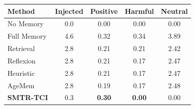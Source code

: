 \begin{tabular}{lcccc}
\toprule
Method & Injected & Positive & Harmful & Neutral \\
\midrule
No Memory & 0.0 & 0.00 & 0.00 & 0.00 \\
Full Memory & 4.6 & 0.32 & 0.34 & 3.89 \\
Retrieval & 2.8 & 0.21 & 0.21 & 2.42 \\
Reflexion & 2.8 & 0.21 & 0.17 & 2.47 \\
Heuristic & 2.8 & 0.21 & 0.17 & 2.47 \\
AgeMem & 2.8 & 0.19 & 0.17 & 2.48 \\
\textbf{SMTR-TCI} & 0.3 & \textbf{0.30} & \textbf{0.00} & 0.00 \\
\bottomrule
\end{tabular}
